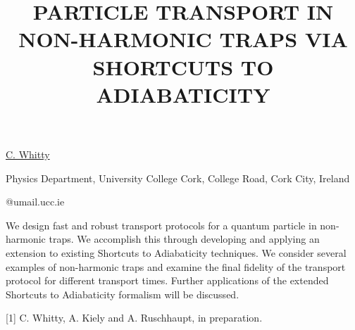 \title{PARTICLE TRANSPORT IN NON-HARMONIC TRAPS VIA SHORTCUTS TO ADIABATICITY}

\underline{C. Whitty}  

{\normalsize{\vspace{-4mm}
Physics Department,
University College Cork,
College Road,
Cork City,
Ireland




@umail.ucc.ie}}

We design fast and robust transport protocols for a quantum particle in non-harmonic traps. 
We accomplish this through developing and applying an extension to existing Shortcuts to Adiabaticity techniques. We consider several examples of non-harmonic traps and examine the final fidelity of the transport protocol for different transport times. Further applications of the extended Shortcuts to Adiabaticity formalism will be discussed.

{\normalsize
[1] C. Whitty, A. Kiely and A. Ruschhaupt, in preparation.
}

\vspace{\baselineskip}